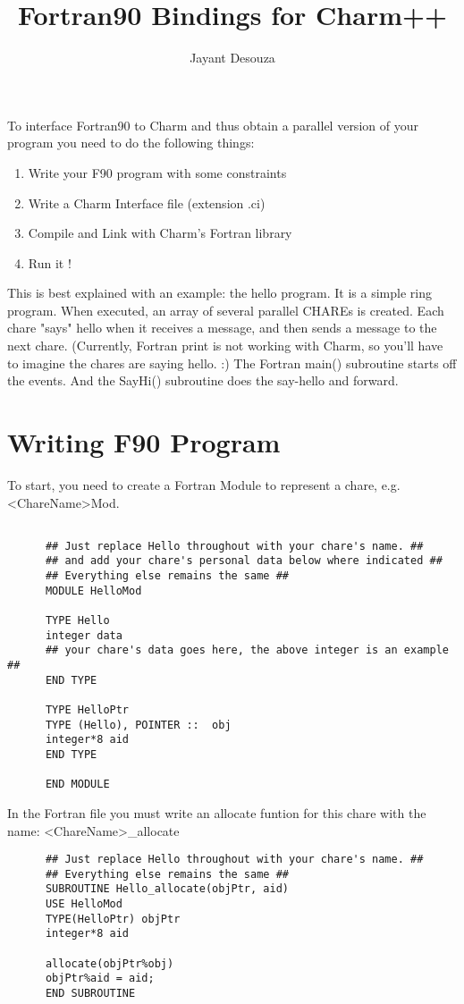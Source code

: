 \documentclass[11pt]{article}
\title{Fortran90 Bindings for Charm++}
\author{Jayant Desouza}
\begin{document}
\maketitle

To interface Fortran90 to Charm and thus obtain a parallel version of
your program you need to do the following things:
\begin{enumerate}
\item Write your F90 program with some constraints
\item Write a Charm Interface file (extension .ci)
\item Compile and Link with Charm's Fortran library
\item Run it !
\end{enumerate}

This is best explained with an example: the hello program.  It is a
simple ring program.  When executed, an array of several parallel
CHAREs is created.  Each chare "says" hello when it receives a
message, and then sends a message to the next chare. (Currently,
Fortran print is not working with Charm, so you'll have to imagine the
chares are saying hello. :) The Fortran main() subroutine starts off
the events.  And the SayHi() subroutine does the say-hello and
forward.

\section{Writing F90 Program}
To start, you need to create a Fortran Module to represent a chare,
e.g. <ChareName>Mod.

\begin{verbatim}

      ## Just replace Hello throughout with your chare's name. ##
      ## and add your chare's personal data below where indicated ##
      ## Everything else remains the same ##
      MODULE HelloMod

      TYPE Hello
      integer data
      ## your chare's data goes here, the above integer is an example ##
      END TYPE

      TYPE HelloPtr
      TYPE (Hello), POINTER ::  obj
      integer*8 aid
      END TYPE

      END MODULE
\end{verbatim}

In the Fortran file you must write an allocate funtion for this chare
with the name: <ChareName>\_allocate

\begin{verbatim}
      ## Just replace Hello throughout with your chare's name. ##
      ## Everything else remains the same ##
      SUBROUTINE Hello_allocate(objPtr, aid)
      USE HelloMod
      TYPE(HelloPtr) objPtr 
      integer*8 aid

      allocate(objPtr%obj)
      objPtr%aid = aid;
      END SUBROUTINE
\end{verbatim}
\end{document}
